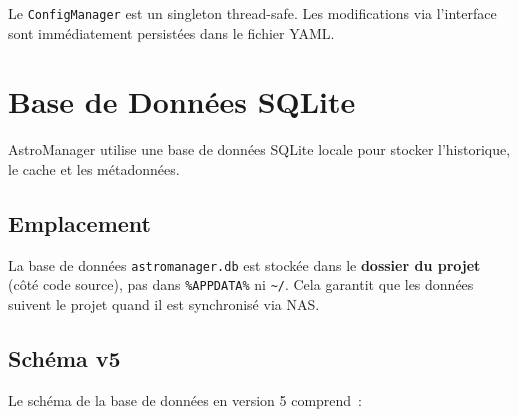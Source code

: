 \documentclass[a4paper,11pt]{article}
\begin{document}
\begin{notebox}
Le \texttt{ConfigManager} est un singleton thread-safe. Les modifications via l'interface sont imm\'{e}diatement persist\'{e}es dans le fichier YAML.
\end{notebox}


\section{Base de Donn\'{e}es SQLite}
\label{sec:sqlite}

AstroManager utilise une base de donn\'{e}es SQLite locale pour stocker l'historique, le cache et les m\'{e}tadonn\'{e}es.

\subsection{Emplacement}

La base de donn\'{e}es \texttt{astromanager.db} est stock\'{e}e dans le \textbf{dossier du projet} (c\^{o}t\'{e} code source), pas dans \texttt{\%APPDATA\%} ni \texttt{\textasciitilde/}. Cela garantit que les donn\'{e}es suivent le projet quand il est synchronis\'{e} via NAS.

\subsection{Sch\'{e}ma v5}

Le sch\'{e}ma de la base de donn\'{e}es en version 5 comprend~:
\end{document}
